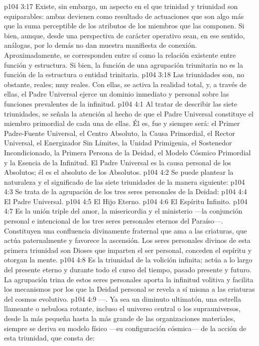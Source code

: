\vs p104 3:17 Existe, sin embargo, un aspecto en el que trinidad y triunidad son equiparables: ambas devienen como resultado de actuaciones que son algo más que la suma perceptible de los atributos de los miembros que las componen. Si bien, aunque, desde una perspectiva de carácter operativo sean, en ese sentido, análogas, por lo demás no dan muestra manifiesta de conexión. Aproximadamente, se corresponden entre sí como la relación existente entre función y estructura. Si bien, la función de una agrupación triunitaria no es la función de la estructura o entidad trinitaria.
\vs p104 3:18 Las triunidades son, no obstante, reales; muy reales. Con ellas, se activa la realidad total, y, a través de ellas, el Padre Universal ejerce un dominio inmediato y personal sobre las funciones prevalentes de la infinitud.
\vs p104 4:1 Al tratar de describir las siete triunidades, se señala la atención al hecho de que el Padre Universal constituye el miembro primordial de cada una de ellas. Él es, fue y siempre será: el Primer Padre\hyp{}Fuente Universal, el Centro Absoluto, la Causa Primordial, el Rector Universal, el Energizador Sin Límites, la Unidad Primigenia, el Sostenedor Incondicionado, la Primera Persona de la Deidad, el Modelo Cósmico Primordial y la Esencia de la Infinitud. El Padre Universal es la causa personal de los Absolutos; él es el absoluto de los Absolutos.
\vs p104 4:2 \pc Se puede plantear la naturaleza y el significado de las siete triunidades de la manera siguiente:
\vs p104 4:3 \pc {} Se trata de la agrupación de los tres seres personales de la Deidad:
\vs p104 4:4 El Padre Universal.
\vs p104 4:5 El Hijo Eterno.
\vs p104 4:6 El Espíritu Infinito.
\vs p104 4:7 \pc Es la unión triple del amor, la misericordia y el ministerio ---la conjunción personal e intencional de los tres seres personales eternos del Paraíso---. Constituyen una confluencia divinamente fraternal que ama a las criaturas, que actúa paternalmente y favorece la ascensión. Los seres personales divinos de esta primera triunidad son Dioses que imparten el ser personal, conceden el espíritu y otorgan la mente.
\vs p104 4:8 Es la triunidad de la volición infinita; actúa a lo largo del presente eterno y durante todo el curso del tiempo, pasado presente y futuro. La agrupación trina de estos seres personales aporta la infinitud volitiva y facilita los mecanismos por los que la Deidad personal se revela a sí misma a las criaturas del cosmos evolutivo.
\vs p104 4:9 \pc {}---. Ya sea un diminuto ultimatón, una estrella llameante o nebulosa rotante, incluso el universo central o los suprauniversos, desde la más pequeña hasta la más grande de las organizaciones materiales, siempre se deriva su modelo físico ---su configuración cósmica--- de la acción de esta triunidad, que consta de:

